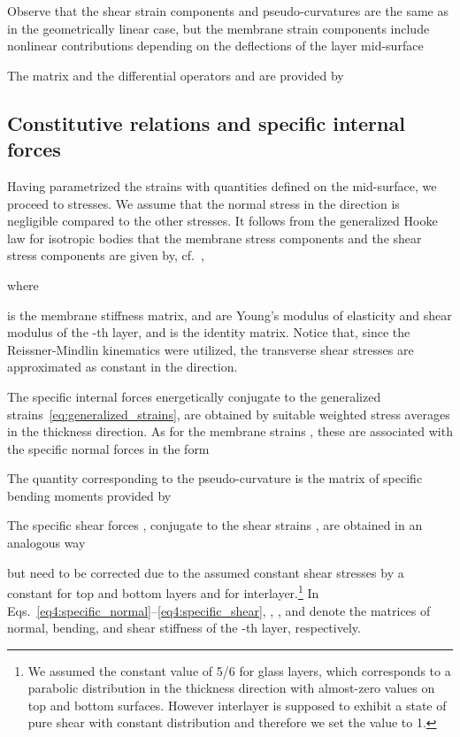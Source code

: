 \documentclass[11pt]{article}
\begin{document}
Observe that the shear strain components and pseudo-curvatures are the same as in the geometrically linear case, but the membrane strain components include nonlinear
contributions depending on the deflections of the layer mid-surface

The matrix  and the differential operators  and
 are provided by


\subsection{Constitutive relations and specific internal forces}\label{sec:constitutive}
Having parametrized the strains with quantities defined on the mid-surface, we
proceed to stresses. We assume that the normal stress in the  direction is negligible compared to the other stresses. It follows from the generalized Hooke law for isotropic
bodies that the membrane stress components and the shear stress components are given by, cf.~\citep{Pica:1980:FEA},

where

is the membrane stiffness matrix,  and  are Young's modulus of elasticity and shear modulus of the -th layer, and  is the identity matrix. Notice that, since the Reissner-Mindlin kinematics were utilized, the transverse shear stresses are approximated as constant in the  direction.

The specific internal forces energetically conjugate to the generalized strains~\eqref{eq:generalized_strains}, are obtained by suitable weighted stress averages in the thickness direction. As for the membrane strains , these are associated with the specific normal forces  in the form

The quantity corresponding to the pseudo-curvature  is
the matrix of specific bending moments  provided by

The specific shear forces , conjugate to the shear strains
, are obtained in an analogous way

but need to be corrected due to the assumed constant shear stresses by a constant  for top and bottom layers and  for interlayer.\footnote{We assumed the constant value of 5/6 for glass layers, which corresponds to a parabolic distribution in the thickness direction with almost-zero values on top and bottom surfaces. However interlayer is supposed to exhibit a state of pure shear with constant distribution and therefore we set the value to 1.} In Eqs.~\eqref{eq4:specific_normal}--\eqref{eq4:specific_shear}, , , and  denote the matrices of normal, bending, and shear stiffness of the -th layer, respectively.
\end{document}
